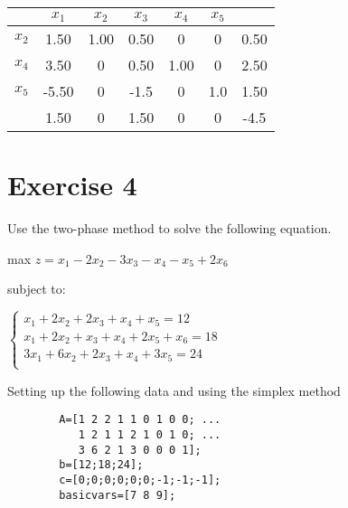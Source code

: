 \documentclass{article}
\begin{document}
        \begin{center}
            \begin{tabular}{ | c | c c c c c | c | }
                \hline
                       & $x_1$ & $x_2$ & $x_3$ & $x_4$ & $x_5$ &  \\
                \hline
                $x_2$ & 1.50  & 1.00   & 0.50 & 0  &  0   & 0.50  \\
                $x_4$ & 3.50  & 0      & 0.50 & 1.00&  0   & 2.50 \\
                $x_5$ & -5.50  & 0  & -1.5    & 0  & 1.0 & 1.50 \\
                \hline
                      & 1.50  & 0  & 1.50    & 0   &  0  & -4.5 \\
                \hline
            \end{tabular}
        \end{center}

\section*{Exercise 4}

    Use the two-phase method to solve the following equation.

    \begin{center}
         max $ z = x_1 - 2x_2 - 3x_3 - x_4 - x_5 + 2x_6 $
    \end{center}

    subject to:

    \begin{center}
        \begin{math}
           \begin{cases}
                    x_1+2x_2+2x_3+x_4+x_5 = 12 \\
                    x_1+2x_2+x_3+x_4+2x_5+x_6 = 18 \\
                    3x_1+6x_2+2x_3+x_4+3x_5 = 24 \\
             \end{cases}
        \end{math}
    \end{center}

    Setting up the following data and using the simplex method

    \begin{lstlisting}
        A=[1 2 2 1 1 0 1 0 0; ...
           1 2 1 1 2 1 0 1 0; ...
           3 6 2 1 3 0 0 0 1];
        b=[12;18;24];
        c=[0;0;0;0;0;0;-1;-1;-1];
        basicvars=[7 8 9];
    \end{lstlisting}
\end{document}
